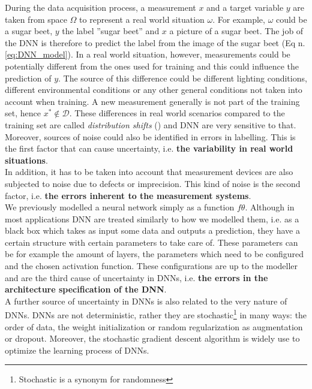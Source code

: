 During the data acquisition process, a measurement $x$ and a target variable $y$ are taken from space $\Omega$ to  represent a real world situation $\omega$. For example, $\omega$ could be a sugar beet, $y$ the label ''sugar beet'' and $x$ a picture of a sugar beet. The job of the DNN is therefore to predict the label from the image of the sugar beet (Eq n. \ref{eq:DNN_model}). In a real world situation, however, measurements could be potentially different from the ones used for training and this could influence the prediction of $y$. The source of this difference could be different lighting conditions, different environmental conditions or any other general conditions not taken into account when training. A new measurement generally is not part of the training set, hence $x^* \notin \mathcal{D}$. These differences in real world scenarios compared to the training set are called \textit{distribution shifts} (\cite{ovadia2019trust}) and DNN are very sensitive to that. Moreover, sources of noise could also be identified in errors in labelling. This is the first factor that can cause uncertainty, i.e. \textbf{the variability in real world situations}. \cite{gawlikowski2021survey}\\
In addition, it has to be taken into account that measurement devices are also subjected to noise due to defects or imprecision. This kind of noise is the second factor, i.e. \textbf{the errors inherent to the measurement systems}. \cite{gawlikowski2021survey}\\
We previously modelled a neural network simply as a function $f\theta$. Although in most applications DNN are treated similarly to how we modelled them, i.e. as a black box which takes as input some data and outputs a prediction, they have a certain structure with certain parameters to take care of. These parameters can be for example the amount of layers, the parameters which need to be configured and the chosen activation function. These configurations are up to the modeller and are the third cause of uncertainty in DNNs, i.e. \textbf{the errors in the architecture specification of the DNN}. \cite{gawlikowski2021survey}\\
A further source of uncertainty in DNNs is also related to the very nature of DNNs. DNNs are not deterministic, rather they are stochastic\footnote{Stochastic is a synonym for randomness} in many ways: the order of data, the weight initialization or random regularization as augmentation or dropout. \cite{gawlikowski2021survey} Moreover, the stochastic gradient descent algorithm is widely use to optimize the learning process of DNNs. \cite{ruder2017overview}\\
